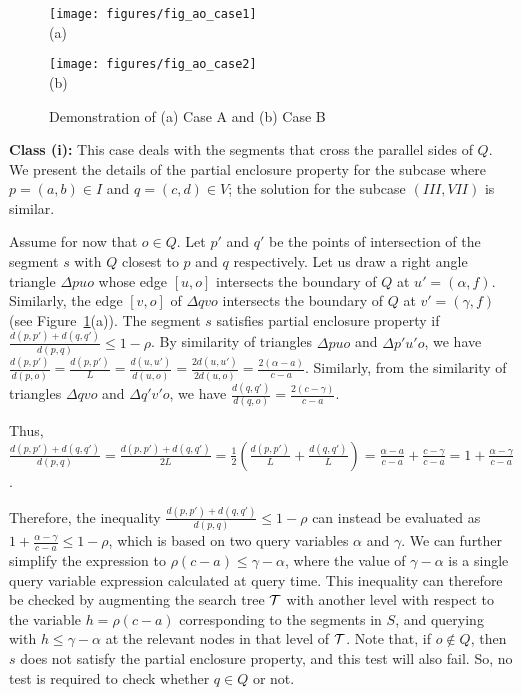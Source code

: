 \begin{figure}[h]
\begin{minipage}[b]{0.5\linewidth}
\centering
\texttt{[image: figures/fig\_ao\_case1]}\\
(a)
\end{minipage}
\begin{minipage}[b]{0.5\linewidth}
\centering
\texttt{[image: figures/fig\_ao\_case2]}\\
(b)
\end{minipage}
\caption{Demonstration of (a) Case A and (b) Case B}
\label{fig:rectangles:ao:case12}
\end{figure}



{\bf Class (i):}
This case deals with the segments that cross the parallel sides of $Q$. 
We present the details of the partial enclosure property for the subcase 
where $p=(a,b) \in I$ and $q=(c,d) \in V$; the solution for the subcase 
$(III, VII)$ is similar.

Assume for now that $o \in Q$. Let 
$p'$ and $q'$ be the points of intersection of the segment $s$ with 
$Q$ closest to $p$  and $q$ respectively. Let us draw a right angle 
triangle $\Delta p u o$ whose edge $[u,o]$ intersects the boundary 
of $Q$ at $u'=(\alpha, f)$. Similarly, the edge $[v,o]$ of  
$\Delta q v o$  intersects the boundary of $Q$ at 
$v' = (\gamma, f)$ (see Figure~\ref{fig:rectangles:ao:case12}(a)). 
The segment $s$ satisfies partial enclosure property if 
$\frac{d(p, p') + d(q, q')}{d(p, q)} \leq 1 - \rho$. By similarity 
of triangles $\Delta puo$ and $\Delta p'u'o$, we have
$\frac{d(p, p')}{d(p, o)} = \frac{d(p, p')}{L} = 
\frac{d(u, u')}{d(u, o)} = \frac{2 d(u, u')}{2 d(u, o)} = 
\frac{2(\alpha - a)}{c - a}$. Similarly, from the similarity of 
triangles $\Delta qvo$ and $\Delta q'v'o$, we have
$\frac{d(q, q')}{d(q, o)} = \frac{2(c - \gamma)}{c - a}$.

Thus, $\frac{d(p,p')+d(q,q')}{d(p,q)}=\frac{d(p,p')+d(q,q')}{2L} = 
\frac{1}{2} \left ( \frac{d(p,p')}{L} + \frac{d(q,q')}{L} \right ) 
 = \frac{\alpha - a}{c - a} + \frac{c - \gamma}{c - a} 
= 1 + \frac{\alpha - \gamma}{c - a}$. 

Therefore, the inequality $\frac{d(p, p') + d(q, q')}{d(p, q)} 
\leq 1 - \rho$ can instead be evaluated as $1 + \frac{\alpha - 
\gamma}{c - a} \leq 1 - \rho$, which is based on two query 
variables $\alpha$ and $\gamma$. We can further simplify the 
expression to $\rho(c - a) \leq \gamma - \alpha$, where the value 
of $\gamma - \alpha$ is a single query variable expression 
calculated at query time. This inequality can therefore be checked 
by augmenting the search tree $\cal T$ with another level with 
respect to the variable $h=\rho(c-a)$ corresponding to the segments 
in $S$, and querying with $h \leq \gamma-\alpha$ at the relevant 
nodes in that level of $\cal T$. Note that, if $o \not\in Q$, then 
$s$ does not satisfy the partial enclosure property, and this test 
will also fail. So, no test is required to check whether $q \in Q$ 
or not.  



